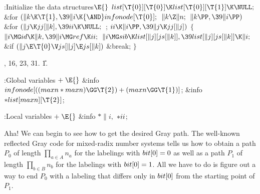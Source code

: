 \B{}:Initialize the data structures\X${}\E{}$\6
$\\{list}[\T{0}][\T{0}]\K\\{list}[\T{0}][\T{1}]\K\NULL;{}$\6
\&{for} ${}(\|k\K\T{1},\39\|i\K{\AND}\\{infonode}[\T{0}];{}$ ${}\|k\Z\|n;{}$
${}\|k\PP,\39\|i\PP){}$\1\6
\&{for} ${}(\|j\K\\{jj}[\|k],\39\\{ii}\K\NULL;{}$  ; ${}\\{ii}\K\|i\PP,\39\|j\K%
\\{jj}[\|j]){}$\5
${}\{{}$\1\6
${}\|i\MG\\{id}\K\|k,\39\|i\MG\\{ref}\K\\{ii};{}$\6
${}\|i\MG\\{sib}\K\\{list}[\|j][\\{js}[\|k]],\39\\{list}[\|j][\\{js}[\|k]]\K%
\|i;{}$\6
\&{if} ${}(\|j\E\T{0}\V\\{js}[\|j]\E\\{js}[\|k]){}$\1\5
\&{break};\2\6
\4${}\}{}$\2\2\par
{}, 16, 23, 31.
\U1.\fi

\B{}:Global variables\X${}\mathrel+\E{}$\6
\&{info} ${}\\{infonode}[((\\{maxn}*\\{maxn})\GG\T{2})+(\\{maxn}\GG\T{1})]{}$;%
\6
\&{info} ${}{*}\\{list}[\\{maxn}][\T{2}]{}$;\par
\fi

\B{}:Local variables\X${}\mathrel+\E{}$\6
\&{info} ${}{*}\|i,{}$ ${}{*}\\{ii}{}$;\par
\fi

Aha! We can begin to see how to get the desired Gray path. The well-known
reflected Gray code for mixed-radix number systems tells us how to obtain a
path $P_0$ of length $\prod_{a\in A}n_a$ for the labelings with $\\{bit}[0]=0$ as
well as a path $P_1$ of length $\prod_{b\in B}n_b$ for the labelings with
$\\{bit}[0]=1$. All we have to do is figure out a way to end $P_0$ with
a labeling that differs only in $\\{bit}[0]$ from the starting point of $P_1$.

